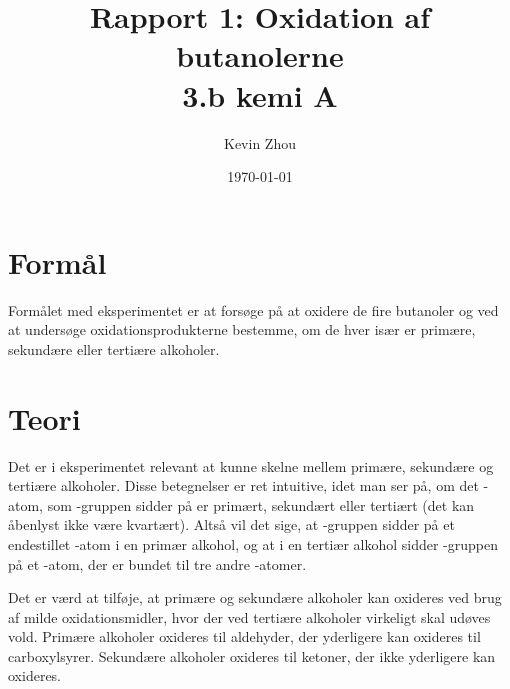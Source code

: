 \documentclass{report}
\title{Rapport 1: Oxidation af butanolerne\\
{\Large \textbf{3.b kemi A}}}
\author{Kevin Zhou}
\date{\today}
\begin{document}
\maketitle
\section*{Formål}
Formålet med eksperimentet er at forsøge på at oxidere de fire butanoler og ved at undersøge oxidationsprodukterne bestemme, om de hver især er primære, sekundære eller tertiære alkoholer.
\section*{Teori}
Det er i eksperimentet relevant at kunne skelne mellem primære, sekundære og tertiære alkoholer.
Disse betegnelser er ret intuitive, idet man ser på, om det -atom, som -gruppen sidder på er primært, sekundært eller tertiært (det kan åbenlyst ikke være kvartært).
Altså vil det sige, at -gruppen sidder på et endestillet -atom i en primær alkohol, og at i en tertiær alkohol sidder -gruppen på et -atom, der er bundet til tre andre -atomer.

Det er værd at tilføje, at primære og sekundære alkoholer kan oxideres ved brug af milde oxidationsmidler, hvor der ved tertiære alkoholer virkeligt skal udøves vold.
Primære alkoholer oxideres til aldehyder, der yderligere kan oxideres til carboxylsyrer.
Sekundære alkoholer oxideres til ketoner, der ikke yderligere kan oxideres.
\end{document}
